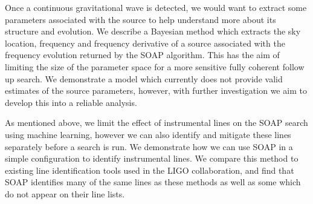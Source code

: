 Once a continuous gravitational wave is detected, we would want to extract some parameters associated with the source to help understand more about its structure and evolution.
We describe a Bayesian method which extracts the sky location, frequency and frequency derivative of a source associated with the frequency evolution returned by the SOAP algorithm.
This has the aim of limiting the size of the parameter space for a more sensitive fully coherent follow up search.
We demonstrate a model which currently does not provide valid estimates of the source parameters, however, with further investigation we aim to develop this into a reliable analysis.


As mentioned above, we limit the effect of instrumental lines on the SOAP search using machine learning, however we can also identify and mitigate these lines separately before a search is run.
We demonstrate how we can use SOAP in a simple configuration to identify instrumental lines.
We compare this method to existing line identification tools used in the \gls{LIGO} collaboration, and find that SOAP identifies many of the same lines as these methods as well as some which do not appear on their line lists.








